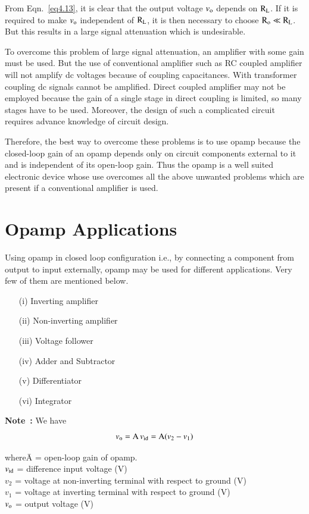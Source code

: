 From Eqn.~\eqref{eq4.13}, it is clear that the output voltage $v_{\textrm{o}}$ depends on $\textrm{R}_{\textrm{L}}$. If it is required to make $v_{\textrm{o}}$ independent of $\textrm{R}_{\textrm{L}}$, it is then necessary to choose $\textrm{R}_{\textrm{o}}\ll \textrm{R}_{\textrm{L}}$. But this results in a large signal attenuation which is undesirable.

To overcome this problem of large signal attenuation, an amplifier with some gain must be used. But the use of conventional amplifier such as RC coupled amplifier will not amplify dc voltages because of coupling capacitances. With transformer coupling dc signals cannot be amplified. Direct coupled amplifier may not be employed because the gain of a single stage in direct coupling is limited, so many stages have to be used. Moreover, the design of such a complicated circuit requires advance knowledge of circuit design.

Therefore, the best way to overcome these problems is to use opamp because the closed-loop gain of an opamp depends only on circuit components external to it and is independent of its open-loop gain. Thus the opamp is a well suited electronic device whose use overcomes all the above unwanted problems which are present if a conventional amplifier is used.

\section{Opamp Applications}\label{sec4.6}

Using opamp in closed loop configuration i.e., by connecting a component from output to input externally, opamp may be used for different applications. Very few of them are mentioned below.
\begin{itemize}
\itemsep=0pt
\item[(i)] Inverting amplifier

\item[(ii)] Non-inverting amplifier

\item[(iii)] Voltage follower

\item[(iv)] Adder and Subtractor

\item[(v)] Differentiator

\item[(vi)] Integrator
\end{itemize}

\noindent
{\bf Note~:} We have
\begin{equation}
v_{\textrm{o}}=\textrm{A} \, v_{\operatorname{id}}=\textrm{A}(v_{2}-v_{1})\label{eq4.14}
\end{equation}
\begin{tabbing}
where\quad \= A = open-loop gain of opamp.\\[3pt] 
           \> $v_{\operatorname{id}}$ = difference input voltage (V)\\[3pt]
           \> $v_{2}$ = voltage at non-inverting terminal with respect to ground (V)\\[3pt]
           \> $v_{1}$ = voltage at inverting terminal with respect to ground (V)\\[3pt]
           \> $v_{\textrm{o}}$ = output voltage (V) 
\end{tabbing}

